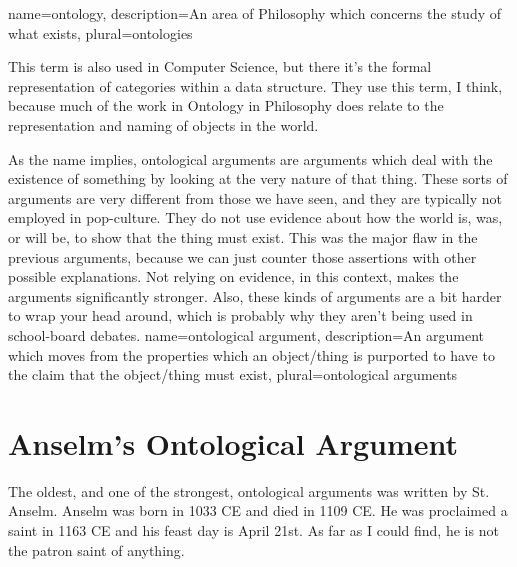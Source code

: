 {
name=ontology,
description={An area of Philosophy which concerns the study of what exists},
plural=ontologies
}


This term is also used in Computer Science, but there it's the formal representation of categories within a data structure. They use this term, I think, because much of the work in Ontology in Philosophy does relate to the representation and naming of objects in the world. 

As the name implies, \glspl{ontological argument} are arguments which deal with the existence of something by looking at the very nature of that thing. These sorts of arguments are very different from those we have seen, and they are typically not employed in pop-culture. They do not use evidence about how the world is, was, or will be, to show that the thing must exist. This was the major flaw in the previous arguments, because we can just counter those assertions with other possible explanations. Not relying on evidence, in this context, makes the arguments significantly stronger. Also, these kinds of arguments are a bit harder to wrap your head around, which is probably why they aren't being used in school-board debates.
{
name=ontological argument,
description={An argument which moves from the properties which an object/thing is purported to have to the claim that the object/thing must exist},
plural=ontological arguments
}

\section{Anselm’s Ontological Argument}

The oldest, and one of the strongest, ontological arguments was written by St. Anselm. Anselm was born in 1033 CE and died in 1109 CE. He was proclaimed a saint in 1163 CE and his feast day is April 21st. As far as I could find, he is not the patron saint of anything. 

